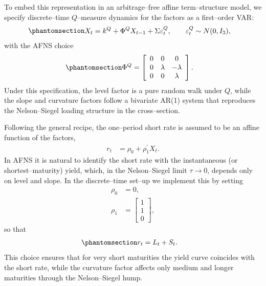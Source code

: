 \documentclass[
  letterpaper,
  DIV=11,
  numbers=noendperiod]{scrreprt}
\begin{document}
To embed this representation in an arbitrage--free affine
term--structure model, we specify discrete--time \(Q\)--measure dynamics
for the factors as a first--order VAR:
\begin{equation}\protect\phantomsection\label{eq-AFNS-Q-VAR}{
\begin{align}
X_t &= k^Q + \Phi^Q X_{t-1} + \Sigma \varepsilon_t^Q,
\qquad \varepsilon_t^Q \sim N(0,I_3),
\end{align}
}\end{equation} with the AFNS choice
\begin{equation}\protect\phantomsection\label{eq-AFNS-PhiQ}{
\begin{align}
\Phi^Q
&=
\left[
\begin{array}{ccc}
0 & 0       & 0      \\
0 & \lambda & -\lambda \\
0 & 0       & \lambda
\end{array}
\right].
\end{align}
}\end{equation} Under this specification, the level factor is a pure
random walk under \(Q\), while the slope and curvature factors follow a
bivariate AR(1) system that reproduces the Nelson--Siegel loading
structure in the cross--section.

Following the general recipe, the one--period short rate is assumed to
be an affine function of the factors,
\begin{align}
r_t &= \rho_0 + \rho_1^\prime X_t.
\end{align}
In AFNS it is natural to identify the short rate with the instantaneous
(or shortest--maturity) yield, which, in the Nelson--Siegel limit
\(\tau \to 0\), depends only on level and slope. In the discrete--time
set--up we implement this by setting
\begin{align}
\rho_0 &= 0, \\
\rho_1
&=
\left[
\begin{array}{c}
1 \\
1 \\
0
\end{array}
\right],
\end{align}
so that
\begin{equation}\protect\phantomsection\label{eq-AFNS-short-rate}{
\begin{align}
r_t &= L_t + S_t.
\end{align}
}\end{equation} This choice ensures that for very short maturities the
yield curve coincides with the short rate, while the curvature factor
affects only medium and longer maturities through the Nelson--Siegel
hump.
\end{document}
